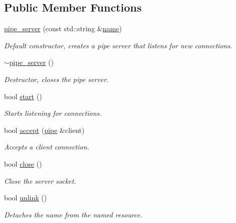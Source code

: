 \subsection*{Public Member Functions}
\begin{DoxyCompactItemize}
\item 
\mbox{\label{classcpen333_1_1process_1_1windows_1_1pipe__server_a56a0e55c0db7c3be6b6c489e761f219a}} 
\hyperlink{classcpen333_1_1process_1_1windows_1_1pipe__server_a56a0e55c0db7c3be6b6c489e761f219a}{pipe\+\_\+server} (const std\+::string \&\hyperlink{classcpen333_1_1process_1_1impl_1_1named__resource__base_a53986a0a1dd26a3602b842c45613b79d}{name})
\begin{DoxyCompactList}\small\item\em Default constructor, creates a pipe server that listens for new connections. \end{DoxyCompactList}\item 
\mbox{\label{classcpen333_1_1process_1_1windows_1_1pipe__server_acea2e918a6ba35f8eb856542ee697334}} 
\hyperlink{classcpen333_1_1process_1_1windows_1_1pipe__server_acea2e918a6ba35f8eb856542ee697334}{$\sim$pipe\+\_\+server} ()
\begin{DoxyCompactList}\small\item\em Destructor, closes the pipe server. \end{DoxyCompactList}\item 
bool \hyperlink{classcpen333_1_1process_1_1windows_1_1pipe__server_a154fb75caf8fc068ab2d6a0a70e96bc9}{start} ()
\begin{DoxyCompactList}\small\item\em Starts listening for connections. \end{DoxyCompactList}\item 
bool \hyperlink{classcpen333_1_1process_1_1windows_1_1pipe__server_ab46c9f9214309d9d8bd8115758863259}{accept} (\hyperlink{classcpen333_1_1process_1_1windows_1_1pipe}{pipe} \&client)
\begin{DoxyCompactList}\small\item\em Accepts a client connection. \end{DoxyCompactList}\item 
bool \hyperlink{classcpen333_1_1process_1_1windows_1_1pipe__server_a4c27e283566395d1f7236bff91413737}{close} ()
\begin{DoxyCompactList}\small\item\em Close the server socket. \end{DoxyCompactList}\item 
bool \hyperlink{classcpen333_1_1process_1_1windows_1_1pipe__server_aa3f9fb4fd88042b09e130cd616815fe1}{unlink} ()
\begin{DoxyCompactList}\small\item\em Detaches the name from the named resource. \end{DoxyCompactList}\end{DoxyCompactItemize}
